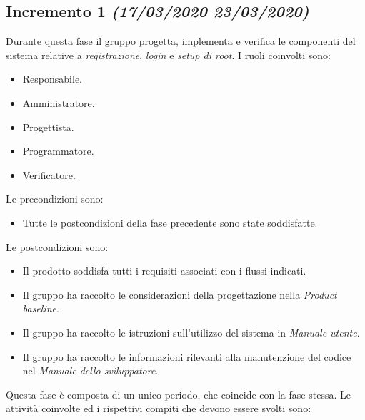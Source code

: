 \documentclass[../piano-di-progetto.tex]{subfiles}
\begin{document}
\subsection[Incremento 1]{Incremento 1 {\normalsize\normalfont\itshape(17/03/2020  23/03/2020)}}%
\label{sub:incremento_1}
Durante questa fase il gruppo progetta, implementa e verifica le componenti del sistema relative a \textit{registrazione}, \textit{login} e \textit{setup di root}.
I ruoli coinvolti sono:
\begin{itemize}
  \item Responsabile.
  \item Amministratore.
  \item Progettista.
  \item Programmatore.
  \item Verificatore.
\end{itemize}
Le precondizioni sono:
\begin{itemize}
  \item Tutte le postcondizioni della fase precedente sono state soddisfatte.
\end{itemize}
Le postcondizioni sono:
\begin{itemize}
  \item Il prodotto soddisfa tutti i requisiti associati con i flussi indicati.
  \item Il gruppo ha raccolto le considerazioni della progettazione nella \textit{Product baseline}.
  \item Il gruppo ha raccolto le istruzioni sull'utilizzo del sistema in \textit{Manuale utente}.
  \item Il gruppo ha raccolto le informazioni rilevanti alla manutenzione del codice nel \textit{Manuale dello sviluppatore}.
\end{itemize}
Questa fase è composta di un unico periodo, che coincide con la fase stessa.
Le attività coinvolte ed i rispettivi compiti che devono essere svolti sono:
\end{document}
